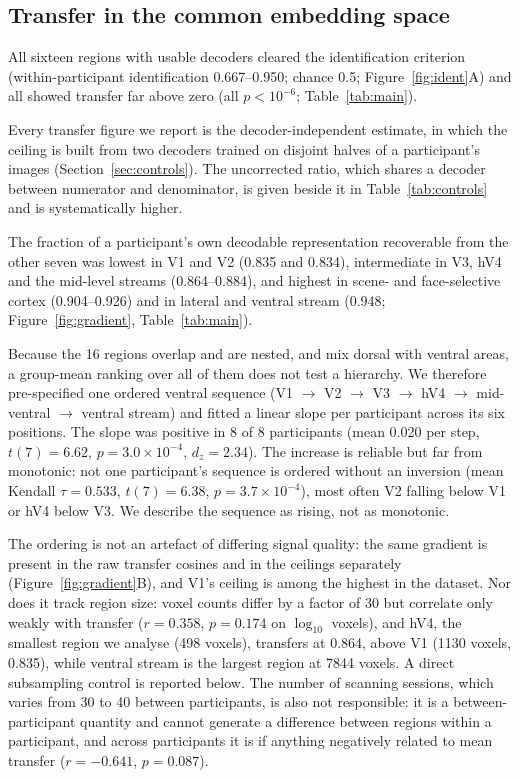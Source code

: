 \documentclass[11pt,a4paper]{article}
\begin{document}
\subsection{Transfer in the common embedding space}

All sixteen regions with usable decoders cleared the identification criterion
(within-participant identification \num{0.667}--\num{0.950}; chance \num{0.5};
Figure~\ref{fig:ident}A) and all showed transfer far above zero (all
$p < 10^{-6}$; Table~\ref{tab:main}).

Every transfer figure we report is the decoder-independent estimate, in which the
ceiling is built from two decoders trained on disjoint halves of a participant's
images (Section~\ref{sec:controls}). The uncorrected ratio, which shares a
decoder between numerator and denominator, is given beside it in
Table~\ref{tab:controls} and is systematically higher.

The fraction of a participant's own decodable representation recoverable from the
other seven was lowest in V1 and V2 (\num{0.835} and \num{0.834}), intermediate
in V3, hV4 and the mid-level streams (\num{0.864}--\num{0.884}), and highest in
scene- and face-selective cortex (\num{0.904}--\num{0.926}) and in lateral and
ventral stream (\num{0.948}; Figure~\ref{fig:gradient},
Table~\ref{tab:main}).

Because the 16 regions overlap and are nested, and mix dorsal with ventral
areas, a group-mean ranking over all of them does not test a hierarchy. We
therefore pre-specified one ordered ventral sequence (V1 $\rightarrow$ V2
$\rightarrow$ V3 $\rightarrow$ hV4 $\rightarrow$ mid-ventral $\rightarrow$
ventral stream) and fitted a linear slope per participant across its six
positions. The slope was positive in 8 of 8 participants (mean
\num{0.020} per step, $t(7) = 6.62$, $p = 3.0\times10^{-4}$, $d_z = 2.34$). The
increase is reliable but far from monotonic: not one participant's sequence is
ordered without an inversion (mean Kendall $\tau = \num{0.533}$,
$t(7) = 6.38$, $p = 3.7\times10^{-4}$), most often V2 falling below V1 or hV4
below V3. We describe the sequence as rising, not as monotonic.

The ordering is not an artefact of differing signal quality: the same gradient is
present in the raw transfer cosines and in the ceilings separately
(Figure~\ref{fig:gradient}B), and V1's ceiling is among the highest in the
dataset. Nor does it track region size: voxel counts differ by a factor of 30 but
correlate only weakly with transfer ($r = \num{0.358}$, $p = 0.174$ on
$\log_{10}$ voxels), and hV4, the smallest region we analyse (\num{498} voxels),
transfers at \num{0.864}, above V1 (\num{1130} voxels, \num{0.835}), while
ventral stream is the largest region at \num{7844} voxels. A direct subsampling
control is reported below.
The number of scanning sessions, which varies from 30 to 40 between participants,
is also not responsible: it is a between-participant quantity and cannot generate
a difference between regions within a participant, and across participants it is
if anything negatively related to mean transfer ($r = -0.641$, $p = 0.087$).
\end{document}
